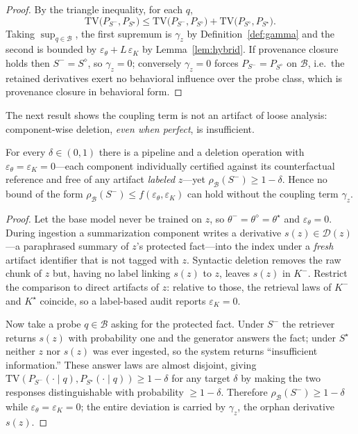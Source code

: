 \begin{proof}
By the triangle inequality, for each $q$,
\[
\mathrm{TV}\!\big(P_{S^{-}},P_{S^{\star}}\big)
\le
\mathrm{TV}\!\big(P_{S^{-}},P_{S^{\diamond}}\big)
+\mathrm{TV}\!\big(P_{S^{\diamond}},P_{S^{\star}}\big).
\]
Taking $\sup_{q\in\mathcal{B}}$, the first supremum is $\gamma_{z}$ by
Definition~\ref{def:gamma} and the second is bounded by
$\varepsilon_{\theta}+L\,\varepsilon_{K}$ by Lemma~\ref{lem:hybrid}.
If provenance closure holds then $S^{-}=S^{\diamond}$, so
$\gamma_{z}=0$; conversely $\gamma_{z}=0$ forces
$P_{S^{-}}=P_{S^{\diamond}}$ on $\mathcal{B}$, i.e.\ the retained
derivatives exert no behavioral influence over the probe class, which is
provenance closure in behavioral form.
\end{proof}

The next result shows the coupling term is not an artifact of loose
analysis: component-wise deletion, \emph{even when perfect}, is
insufficient.

\begin{proposition}
\label{prop:necessity}
For every $\delta\in(0,1)$ there is a pipeline and a deletion operation
with $\varepsilon_{\theta}=\varepsilon_{K}=0$---each component
individually certified against its counterfactual reference and free of
any artifact \emph{labeled} $z$---yet
$\rho_{\mathcal{B}}(S^{-})\ge 1-\delta$. Hence no bound of the form
$\rho_{\mathcal{B}}(S^{-})\le f(\varepsilon_{\theta},\varepsilon_{K})$
can hold without the coupling term $\gamma_{z}$.
\end{proposition}

\begin{proof}
Let the base model never be trained on $z$, so
$\theta^{-}=\theta^{\diamond}=\theta^{\star}$ and
$\varepsilon_{\theta}=0$. During ingestion a summarization component
writes a derivative $s(z)\in\mathcal{D}(z)$---a paraphrased summary of
$z$'s protected fact---into the index under a \emph{fresh} artifact
identifier that is not tagged with $z$. Syntactic deletion removes the
raw chunk of $z$ but, having no label linking $s(z)$ to $z$, leaves
$s(z)$ in $K^{-}$. Restrict the comparison to direct artifacts of $z$:
relative to those, the retrieval laws of $K^{-}$ and $K^{\star}$
coincide, so a label-based audit reports $\varepsilon_{K}=0$.

Now take a probe $q\in\mathcal{B}$ asking for the protected fact. Under
$S^{-}$ the retriever returns $s(z)$ with probability one and the
generator answers the fact; under $S^{\star}$ neither $z$ nor $s(z)$ was
ever ingested, so the system returns ``insufficient information.'' These
answer laws are almost disjoint, giving
$\mathrm{TV}(P_{S^{-}}(\cdot\mid q),P_{S^{\star}}(\cdot\mid q))\ge1-\delta$
for any target $\delta$ by making the two responses distinguishable with
probability $\ge1-\delta$. Therefore $\rho_{\mathcal{B}}(S^{-})\ge1-\delta$
while $\varepsilon_{\theta}=\varepsilon_{K}=0$; the entire deviation is
carried by $\gamma_{z}$, the orphan derivative $s(z)$.
\end{proof}

